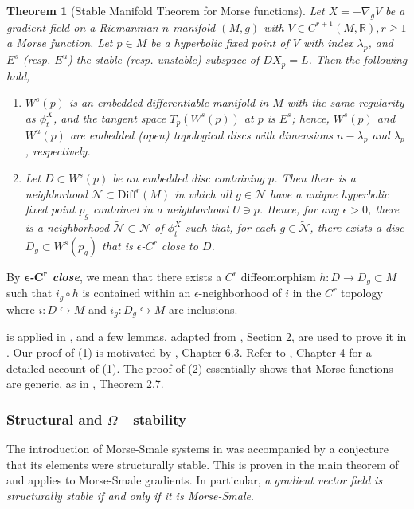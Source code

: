 \documentclass[12pt]{article}
\newtheorem{theorem}{Theorem}
\begin{document}
\begin{theorem}[Stable Manifold Theorem for Morse functions]
\label{theorem:stable-manifold-theorem-morse}
    Let $X = -\nabla_g V$ be a gradient field on a Riemannian $n$-manifold $(M,g)$ with $V \in C^{r+1}(M,\mathbb{R}), r \geq 1$ a Morse function. Let $p \in M$ be a hyperbolic fixed point of $V$ with index $\lambda_p$, and $E^s$ (resp. $E^u$) the stable (resp. unstable) subspace of $DX_p = L$. Then the following hold,
    \begin{enumerate}
        \item $W^s(p)$ is an embedded differentiable manifold in $M$ with the same regularity as $\phi^X_t$, and the tangent space $T_p(W^s(p))$ at $p$ is $E^s$; hence, 
        $W^s(p)$ and $W^u(p)$ are embedded (open) topological discs with dimensions $n-\lambda_p$ and $\lambda_p$, respectively.
        \item Let $D \subset W^s(p)$ be an embedded disc containing $p$. Then there is a neighborhood $\mathcal{N} \subset \text{Diff}^r(M)$ in which all $g \in \mathcal{N}$ have a unique hyperbolic fixed point $p_g$ contained in a neighborhood $U \ni p$. Hence, for any $\epsilon > 0$, there is a neighborhood $\tilde{\mathcal{N}} \subset \mathcal{N}$ of $\phi_t^X$ such that, for each $g \in \tilde{\mathcal{N}}$, there exists a disc $D_g \subset W^s(p_g)$ that is $\epsilon$-$C^r$ close to $D$.
    \end{enumerate}
\end{theorem}
By \textit{\textbf{$\bm{\epsilon}$-$\bm{C^r}$ close}}, we mean that there exists a $C^r$ diffeomorphism $h:D \rightarrow D_g \subset M$ such that $i_g \circ h$ is contained within an $\epsilon$-neighborhood of $i$ in the $C^r$ topology where $i: D \hookrightarrow M$ and $i_g:D_g \hookrightarrow M$ are inclusions. 

 is applied in , and a few lemmas, adapted from \cite{milnor2025lectures}, Section 2, are used to prove it in . Our proof of (1) is motivated by \cite{cohennotes}, Chapter 6.3. Refer to \cite{banyaga2004lectures}, Chapter 4 for a detailed account of (1). The proof of (2) essentially shows that Morse functions are generic, as in \cite{milnor2025lectures}, Theorem 2.7.

\subsubsection{Structural and $\Omega-$stability}
\label{subsubsection:structural-and-omega-stability}
The introduction of Morse-Smale systems in \cite{smale1960morse} was accompanied by a conjecture that its elements were structurally stable. This is proven in the main theorem of \cite{smale1970structural} and applies to Morse-Smale gradients. In particular, \textit{a gradient vector field is structurally stable if and only if it is Morse-Smale}. 
\end{document}
